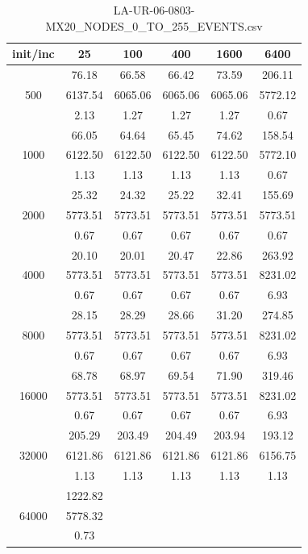 {\begin{table}[th]
\caption{LA-UR-06-0803-MX20\_NODES\_0\_TO\_255\_EVENTS.csv}
\label{tab:LA-UR-06-0803-MX20_NODES_0_TO_255_EVENTS.csv}
\centering
\begin{tabular}{|c||c|c|c|c|c|}
\hline
init/inc & 25 & 100 & 400 & 1600 & 6400 \\ \hline \hline
  & 76.18 & 66.58 & 66.42 & 73.59 & 206.11\\ 
500  & 6137.54 & 6065.06 & 6065.06 & 6065.06 & 5772.12\\ 
  & 2.13 & 1.27 & 1.27 & 1.27 & 0.67\\ \hline 
  & 66.05 & 64.64 & 65.45 & 74.62 & 158.54\\ 
1000  & 6122.50 & 6122.50 & 6122.50 & 6122.50 & 5772.10\\ 
  & 1.13 & 1.13 & 1.13 & 1.13 & 0.67\\ \hline 
  & 25.32 & 24.32 & 25.22 & 32.41 & 155.69\\ 
2000  & 5773.51 & 5773.51 & 5773.51 & 5773.51 & 5773.51\\ 
  & 0.67 & 0.67 & 0.67 & 0.67 & 0.67\\ \hline 
  & 20.10 & 20.01 & 20.47 & 22.86 & 263.92\\ 
4000  & 5773.51 & 5773.51 & 5773.51 & 5773.51 & 8231.02\\ 
  & 0.67 & 0.67 & 0.67 & 0.67 & 6.93\\ \hline 
  & 28.15 & 28.29 & 28.66 & 31.20 & 274.85\\ 
8000  & 5773.51 & 5773.51 & 5773.51 & 5773.51 & 8231.02\\ 
  & 0.67 & 0.67 & 0.67 & 0.67 & 6.93\\ \hline 
  & 68.78 & 68.97 & 69.54 & 71.90 & 319.46\\ 
16000  & 5773.51 & 5773.51 & 5773.51 & 5773.51 & 8231.02\\ 
  & 0.67 & 0.67 & 0.67 & 0.67 & 6.93\\ \hline 
  & 205.29 & 203.49 & 204.49 & 203.94 & 193.12\\ 
32000  & 6121.86 & 6121.86 & 6121.86 & 6121.86 & 6156.75\\ 
  & 1.13 & 1.13 & 1.13 & 1.13 & 1.13\\ \hline 
  & 1222.82 &  &  &  & \\ 
64000  & 5778.32 &  &  &  & \\ 
  & 0.73 &  &  &  & \\ \hline 
\end{tabular}
\end{table}
}%

